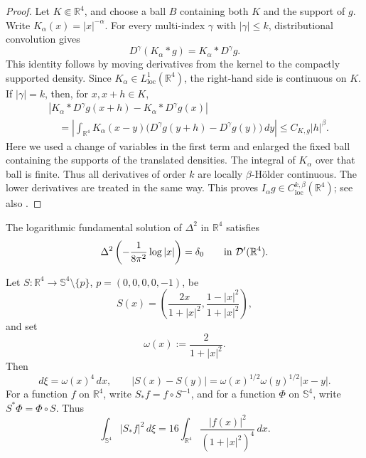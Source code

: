 \documentclass[11pt]{article}
\numberwithin{equation}{section}
\begin{document}
\begin{proof}
Let \(K\Subset\mathbb R^{4}\), and choose a ball \(B\) containing both
\(K\) and the support of \(g\). Write
\(K_{\alpha}(x)=|x|^{-\alpha}\). For every multi-index
\(\gamma\) with \(|\gamma|\leq k\), distributional convolution gives
\[
D^{\gamma}(K_{\alpha}*g)
=K_{\alpha}*D^{\gamma}g.
\]
This identity follows by moving derivatives from the kernel to the compactly
supported density. Since \(K_{\alpha}\in L^{1}_{\operatorname{loc}}
(\mathbb R^{4})\), the right-hand side is continuous on \(K\). If
\(|\gamma|=k\), then, for \(x,x+h\in K\),
\[
\begin{aligned}
&|K_{\alpha}*D^{\gamma}g(x+h)
-K_{\alpha}*D^{\gamma}g(x)|\\
&\quad=\left|\int_{\mathbb R^{4}}K_{\alpha}(x-y)
\bigl(D^{\gamma}g(y+h)-D^{\gamma}g(y)\bigr)\,dy\right|
\leq C_{K,g}|h|^{\beta}.
\end{aligned}
\]
Here we used a change of variables in the first term and enlarged the fixed
ball containing the supports of the translated densities. The integral of
\(K_{\alpha}\) over that ball is finite. Thus all derivatives of order
\(k\) are locally \(\beta\)-H\"older continuous. The lower derivatives
are treated in the same way. This proves
\(I_{\alpha}g\in C^{k,\beta}_{\operatorname{loc}}(\mathbb R^{4})\);
see also \cite{Stein}.
\end{proof}

The logarithmic fundamental solution of \(\Delta^{2}\) in \(\mathbb R^{4}\) satisfies
\begin{equation*}
\Delta^{2}\left(-\frac{1}{8\pi^{2}}\log|x|\right)=\delta_{0}
\qquad\hbox{in }\mathcal D'(\mathbb R^{4}).
\end{equation*}

Let \(S:\mathbb R^{4}\to\mathbb S^{4}\setminus\{p\}\), \(p=(0,0,0,0,-1)\), be
\begin{equation}\label{eq:stereo}
S(x)=
\left(
\frac{2x}{1+|x|^{2}},
\frac{1-|x|^{2}}{1+|x|^{2}}
\right),
\end{equation}
and set
\begin{equation}\label{eq:omega}
\omega(x):=\frac{2}{1+|x|^{2}}.
\end{equation}
Then
\begin{equation}\label{eq:stereo-identities}
d\xi=\omega(x)^{4}\,dx,
\qquad
|S(x)-S(y)|=\omega(x)^{1/2}\omega(y)^{1/2}|x-y|.
\end{equation}
For a function \(f\) on \(\mathbb R^{4}\), write \(S_{*}f=f\circ S^{-1}\), and for a function \(\Phi\) on \(\mathbb S^{4}\), write \(S^{*}\Phi=\Phi\circ S\). Thus
\begin{equation}\label{eq:L2-isometry}
\int_{\mathbb S^{4}}|S_{*}f|^{2}\,d\xi
=16\int_{\mathbb R^{4}}
\frac{|f(x)|^{2}}{(1+|x|^{2})^{4}}\,dx.
\end{equation}
\end{document}
